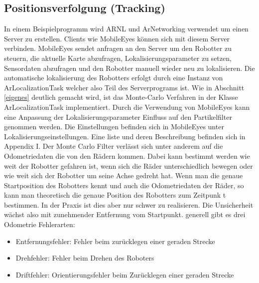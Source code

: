\documentclass{article}
\begin{document}
\subsection{Positionsverfolgung (Tracking)}\label{tracking}
In einem Beispielprogramm wird ARNL und ArNetworking verwendet um einen Server zu erstellen. Clients wie MobileEyes k\"onnen sich mit diesem Server verbinden. MobileEyes sendet anfragen an den Server um den Robotter zu steuern, die aktuelle Karte abzufragen, Lokalisierungsparameter zu setzen, Sensordaten abzufragen und den Robotter manuell wieder neu zu lokalisieren.
Die automatische lokalisierung des Robotters erfolgt durch eine Instanz von ArLocalizationTask welcher also Teil des Serverprograms ist. Wie in Abschnitt \ref{eigenes} deutlich gemacht wird, ist das Monte-Carlo Verfahren in der Klasse ArLocalizationTask implementiert.
Durch die Verwendung von MobileEyes kann eine Anpassung der Lokalisierungsparameter Einfluss auf den Partikelfilter genommen werden.
Die Einstellungen befinden sich in MobileEyes unter Lokalisierungseinstellungen. Eine  liste und deren Beschreibung befinden sich in Appendix I.
Der Monte Carlo Filter verl\"asst sich unter anderem auf die Odometriedaten die von den R\"adern kommen. Dabei kann bestimmt werden wie weit der Robotter gefahren ist, wenn sich die R\"ader unterschiedlich bewegen oder  wie weit sich der Robotter um seine Achse gedreht hat. Wenn man die genaue Startposition des Robotters kennt und auch die Odometriedaten der R\"ader, so kann man theoretisch die genaue Position des Robotters zum Zeitpunk t bestimmen. In der Praxis ist dies aber nur schwer zu realisieren. Die Unsicherheit
w\"achst also mit zunehmender Entfernung vom Startpunkt. generell gibt es drei Odometrie Fehlerarten:
\begin{itemize}
\item Entfernungsfehler: Fehler beim zur\"ucklegen einer geraden Strecke
\item Drehfehler: Fehler beim Drehen des Roboters
\item Driftfehler: Orientierungsfehler beim Zur\"ucklegen einer geraden Strecke
\end{itemize}
\end{document}
